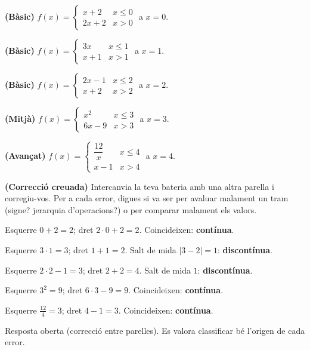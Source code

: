 \begin{exercicis}
\begin{exlist}
  \item \textbf{(Bàsic)} $f(x)=\begin{cases}x+2 & x\le 0\\ 2x+2 & x>0\end{cases}$ a $x=0$.
  \item \textbf{(Bàsic)} $f(x)=\begin{cases}3x & x\le 1\\ x+1 & x>1\end{cases}$ a $x=1$.
  \item \textbf{(Bàsic)} $f(x)=\begin{cases}2x-1 & x\le 2\\ x+2 & x>2\end{cases}$ a $x=2$.
  \item \textbf{(Mitjà)} $f(x)=\begin{cases}x^2 & x\le 3\\ 6x-9 & x>3\end{cases}$ a $x=3$.
  \item \textbf{(Avançat)} $f(x)=\begin{cases}\dfrac{12}{x} & x\le 4\\ x-1 & x>4\end{cases}$ a $x=4$.
  \item \textbf{(Correcció creuada)} Intercanvia la teva bateria amb una altra parella i
        corregiu-vos. Per a cada error, digues si va ser per avaluar malament un tram
        (signe? jerarquia d'operacions?) o per comparar malament els valors.
\end{exlist}
\end{exercicis}

\begin{solucions}
\begin{sollist}
  \item Esquerre $0+2=2$; dret $2\cdot 0+2=2$. Coincideixen: \textbf{contínua}.
  \item Esquerre $3\cdot 1=3$; dret $1+1=2$. Salt de mida $|3-2|=1$: \textbf{discontínua}.
  \item Esquerre $2\cdot 2-1=3$; dret $2+2=4$. Salt de mida $1$: \textbf{discontínua}.
  \item Esquerre $3^2=9$; dret $6\cdot 3-9=9$. Coincideixen: \textbf{contínua}.
  \item Esquerre $\frac{12}{4}=3$; dret $4-1=3$. Coincideixen: \textbf{contínua}.
  \item Resposta oberta (correcció entre parelles). Es valora classificar bé l'origen
        de cada error.
\end{sollist}
\end{solucions}
